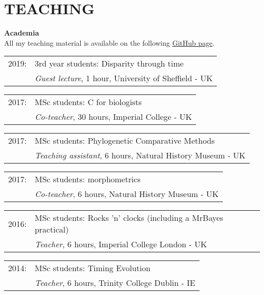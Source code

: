 \documentclass[10pt,a4paper]{article}
\begin{document}
{\section{TEACHING}
\bigskip

\raggedright\textbf{Academia}\\[1.5ex]
All my teaching material is available on the following \href{https://github.com/TGuillermeTeaching}{GitHub page}.
\begin{tabular}{ll}
2019: & 3rd year students: Disparity through time\\
      & \textit{Guest lecture}, 1 hour, University of Sheffield - UK \\
\end{tabular}
\begin{tabular}{ll}
2017: & MSc students: C for biologists\\
      & \textit{Co-teacher}, 30 hours, Imperial College - UK \\
\end{tabular}
\begin{tabular}{ll}
2017: & MSc students: Phylogenetic Comparative Methods\\
      & \textit{Teaching assistant}, 6 hours, Natural History Museum - UK \\
\end{tabular}
\begin{tabular}{ll}
2017: & MSc students: morphometrics\\
      & \textit{Co-teacher}, 6 hours, Natural History Museum - UK \\
\end{tabular}
\begin{tabular}{ll}
2016: & MSc students: Rocks 'n' clocks (including a MrBayes practical)\\
      & \textit{Teacher}, 6 hours, Imperial College London - UK \\
\end{tabular}
\begin{tabular}{ll}
2014: & MSc students: Timing Evolution \\
      & \textit{Teacher}, 6 hours, Trinity College Dublin - IE \\
\end{tabular}
\begin{tabular}{ll}

\end{tabular}}
\end{document}
